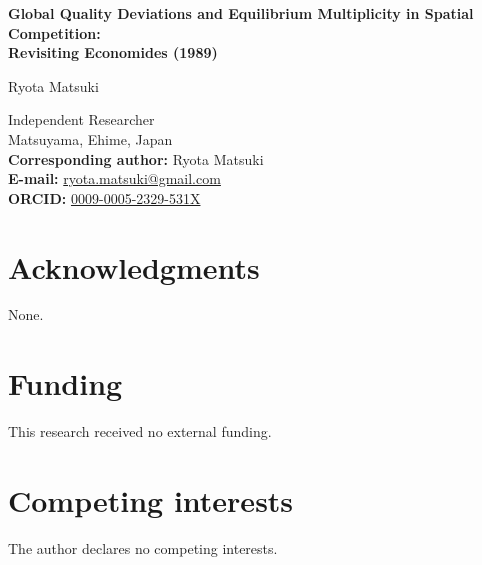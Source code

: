 \documentclass[11pt]{article}
\begin{document}
\thispagestyle{empty}

\begin{center}
{\Large\bfseries Global Quality Deviations and Equilibrium Multiplicity in Spatial Competition:\\[0.4em]Revisiting Economides (1989)\par}
\vspace{2em}

{\large Ryota Matsuki\par}
\vspace{0.5em}
Independent Researcher\\
Matsuyama, Ehime, Japan\\[0.8em]
\textbf{Corresponding author:} Ryota Matsuki\\
\textbf{E-mail:} \href{mailto:ryota.matsuki@gmail.com}{ryota.matsuki@gmail.com}\\
\textbf{ORCID:} \href{https://orcid.org/0009-0005-2329-531X}{0009-0005-2329-531X}
\end{center}

\vspace{2em}
\section*{Acknowledgments}
None.

\section*{Funding}
This research received no external funding.

\section*{Competing interests}
The author declares no competing interests.
\end{document}

